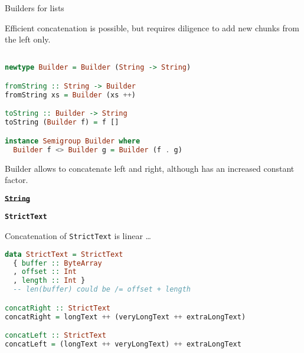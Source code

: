 \documentclass[handout]{beamer}
\begin{document}
\begin{frame}[fragile]{Builders for lists}

Efficient concatenation is possible, but requires diligence
        to add new chunks from the left only.

\begin{lstlisting}[language=Haskell]

newtype Builder = Builder (String -> String)

fromString :: String -> Builder
fromString xs = Builder (xs ++)

toString :: Builder -> String
toString (Builder f) = f []

instance Semigroup Builder where
  Builder f <> Builder g = Builder (f . g)
\end{lstlisting}

Builder allows to concatenate left and right,
        although has an increased constant factor.

\end{frame}



\begin{frame}[fragile]


\begin{block}{}
\bigskip
\centerline{\Huge\bf \color{ukraine-blue} \st{\tt String}}
\bigskip
\end{block}

\begin{block}{}
\bigskip
\centerline{\Huge\bf \color{ukraine-blue} {\tt StrictText}}
\bigskip
\end{block}

\end{frame}


\begin{frame}[fragile]{Concatenation of {\tt StrictText} is linear \dots}
\begin{lstlisting}[language=Haskell]
data StrictText = StrictText
  { buffer :: ByteArray
  , offset :: Int
  , length :: Int }
  -- len(buffer) could be /= offset + length

concatRight :: StrictText
concatRight = longText ++ (veryLongText ++ extraLongText)

concatLeft :: StrictText
concatLeft = (longText ++ veryLongText) ++ extraLongText
\end{lstlisting}
\end{frame}
\end{document}
